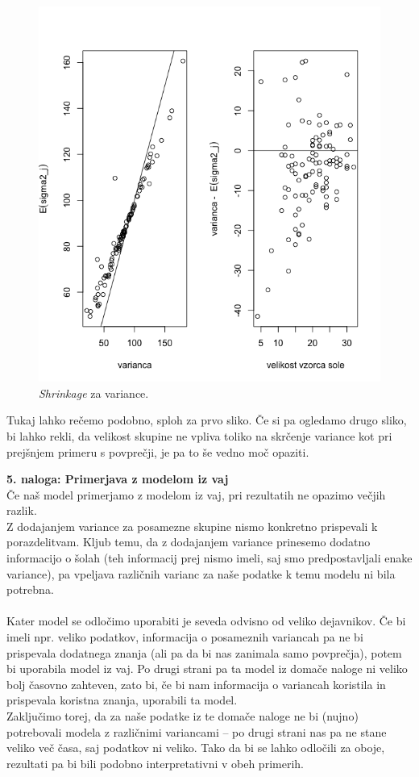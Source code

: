 \documentclass[a4paper,11pt]{article}
\begin{document}
\begin{figure}[ht!]
    \centering
    \includegraphics[width = 150mm]{Slike/4_var.png}
    \caption{\textit{Shrinkage} za variance.}
\end{figure}
\noindent
Tukaj lahko rečemo podobno, sploh za prvo sliko. Če si pa ogledamo drugo sliko, bi lahko rekli, da velikost skupine ne vpliva toliko na skrčenje variance kot pri prejšnjem primeru s povprečji, je pa to še vedno moč opaziti.

\newpage
\noindent
\textbf{5. naloga: Primerjava z modelom iz vaj}
\\
Če naš model primerjamo z modelom iz vaj, pri rezultatih ne opazimo večjih razlik.
\\
Z dodajanjem variance za posamezne skupine nismo konkretno prispevali k porazdelitvam. 
Kljub temu, da z dodajanjem variance prinesemo dodatno informacijo o šolah (teh informacij prej nismo imeli, saj smo predpostavljali enake variance), pa vpeljava različnih varianc za naše podatke k temu modelu ni bila potrebna.
\\
\\
Kater model se odločimo uporabiti je seveda odvisno od veliko dejavnikov. Če bi imeli npr. veliko podatkov, informacija o posameznih variancah pa ne bi prispevala dodatnega znanja (ali pa da bi nas zanimala samo povprečja), potem bi uporabila model iz vaj.
Po drugi strani pa ta model iz domače naloge ni veliko bolj časovno zahteven, zato bi, če bi nam informacija o variancah koristila in prispevala koristna znanja, uporabili ta model.
\\
Zaključimo torej, da za naše podatke iz te domače naloge ne bi (nujno) potrebovali modela z različnimi variancami -- po drugi strani nas pa ne stane veliko več časa, saj podatkov ni veliko. Tako da bi se lahko odločili za oboje, rezultati pa bi bili podobno interpretativni v obeh primerih.
\end{document}
